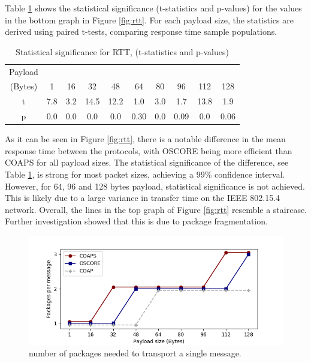{Table \ref{tab:tstat} shows the statistical significance (t-statistics and p-values) for the values in the bottom graph in Figure \ref{fig:rtt}. For each payload size, the statistics are derived using paired t-tests, comparing response time sample populations.

\begin{table}[h]
\centering
\caption {Statistical significance for RTT, (t-statistics and p-values)} \label{tab:title} 
\small\addtolength{\tabcolsep}{-2pt}
\begin{tabular}{c|c|c|c|c|c|c|c|c|c}
Payload \\ (Bytes)  & 1    & 16   & 32   & 48   & 64   & 80   & 96   & 112  & 128  \\ \hline
                  t & 7.8  & 3.2  & 14.5 & 12.2 & 1.0  & 3.0  & 1.7  & 13.8 & 1.9  \\ 
                  p & 0.0 & 0.0 & 0.0 & 0.0    & 0.30 & 0.0 & 0.09 & 0.0 & 0.06
\end{tabular}
\label{tab:tstat}
\end{table}

As it can be seen in Figure \ref{fig:rtt}, there is a notable difference in the mean response time between the protocols, with OSCORE being more efficient than COAPS for all payload sizes. The statistical significance of the difference, see Table \ref{tab:tstat}, is strong for most packet sizes, achieving a 99\% confidence interval. However, for 64, 96 and 128 bytes payload, statistical significance is not achieved. This is likely due to a large variance in transfer time on the IEEE 802.15.4 network. Overall, the lines in the top graph of Figure \ref{fig:rtt} resemble a staircase. Further investigation showed that this is due to package fragmentation.

\begin{figure}
\centering
\includegraphics[width=1.0\textwidth]{papers/oscore/images/frags.png}
\caption[Fragmentation measurements]{number of packages needed to transport a single message. }
\label{fig:frag}
\end{figure}

}
